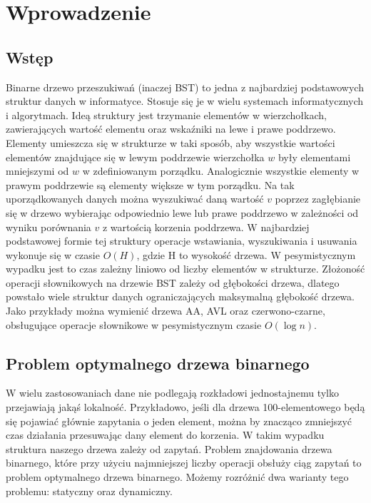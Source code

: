 \documentclass[declaration,shortabstract]{iithesis}
\author         {Julia Majkowska}
\theoremstyle{thm}
\theoremstyle{remark}
\theoremstyle{plain}
\theoremstyle{plain}
\theoremstyle{plain}
\begin{document}

  

\chapter{Wprowadzenie}   

\section{Wstęp}   

Binarne drzewo przeszukiwań (inaczej BST) to jedna z najbardziej podstawowych struktur danych w informatyce. Stosuje się je w wielu systemach informatycznych i algorytmach. Ideą struktury jest trzymanie elementów w wierzchołkach, zawierających wartość elementu oraz wskaźniki na lewe i prawe poddrzewo. Elementy umieszcza się w strukturze w taki sposób, aby wszystkie wartości elementów znajdujące się w lewym poddrzewie wierzchołka \(w\) były elementami mniejszymi od \(w\) w zdefiniowanym porządku. Analogicznie wszystkie elementy w prawym poddrzewie są elementy większe w tym porządku. Na tak uporządkowanych danych można wyszukiwać daną wartość \(v\) poprzez zagłębianie się w drzewo wybierając odpowiednio lewe lub prawe poddrzewo w zależności od wyniku porównania \(v\) z wartością korzenia poddrzewa. W najbardziej podstawowej formie tej struktury operacje wstawiania, wyszukiwania i usuwania wykonuje się w czasie \(O(H)\), gdzie H to wysokość drzewa. W pesymistycznym wypadku jest to czas zależny liniowo od liczby elementów w strukturze. Złożoność operacji słownikowych na drzewie BST zależy od głębokości drzewa, dlatego powstało wiele struktur danych ograniczających maksymalną głębokość drzewa. Jako przykłady można wymienić drzewa AA, AVL oraz czerwono-czarne, obsługujące operacje słownikowe w pesymistycznym czasie \(O(\log n)\).   

 

\section{Problem optymalnego drzewa binarnego}   

W wielu zastosowaniach dane nie podlegają rozkładowi jednostajnemu tylko przejawiają jakąś lokalność. Przykładowo, jeśli dla drzewa 100-elementowego będą się pojawiać głównie zapytania o jeden element, można by znacząco zmniejszyć czas działania przesuwając dany element do korzenia. W takim wypadku struktura naszego drzewa zależy od zapytań. Problem znajdowania drzewa binarnego, które przy użyciu najmniejszej liczby operacji obsłuży ciąg zapytań to problem optymalnego drzewa binarnego. Możemy rozróżnić dwa warianty tego problemu: statyczny oraz dynamiczny.   
\end{document}
